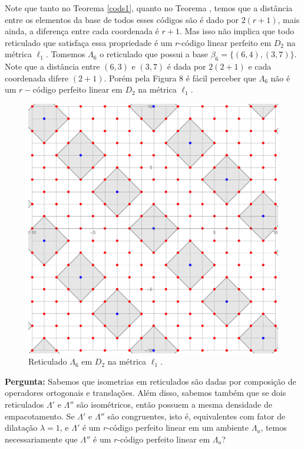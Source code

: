 \documentclass{article}
\theoremstyle{plain}
\theoremstyle{definition}
\theoremstyle{remark}
\begin{document}
  Note que tanto no Teorema \ref{cods1}, quanto no Teorema , temos que a distância entre os elementos da base de todos esses códigos são é dado por $2(r+1)$, mais ainda, a diferença entre cada coordenada é $r+1$. Mas isso não implica que todo reticulado que satisfaça essa propriedade é um $r$-código linear perfeito em $D_2$ na métrica $\ell_1$. Tomemos $\Lambda_6$ o reticulado que possui a base $\beta_6 = \{(6,4),(3,7)\}$. Note que a distância entre $(6,3)$ e $(3,7)$ é dada por $2(2+1)$ e cada coordenada difere $(2+1)$. Porém pela Figura 8 é fácil perceber que $\Lambda_6$ não é um $r-$código perfeito linear em $D_2$ na métrica $\ell_1$. 

  \begin{figure}[ht]
    \centering
        \includegraphics[scale=0.23]{notperfect.pdf}
        \caption{Reticulado $\Lambda_6$ em $D_2$ na métrica $\ell_1$.}
  \end{figure}

  \hspace{-0.5cm}\textbf{Pergunta:} Sabemos que isometrias em reticulados são dadas por composição de operadores ortogonais e translações. Além disso, sabemos também que se dois reticulados $\Lambda'$ e $\Lambda''$ são isométricos, então possuem a mesma densidade de empacotamento. Se $\Lambda'$ e $\Lambda''$ são congruentes, isto é, equivalentes com fator de dilatação $\lambda=1$, e $\Lambda'$ é um $r$-código perfeito linear em um ambiente $\Lambda_a$, temos necessariamente que $\Lambda''$ é um $r$-código perfeito linear em $\Lambda_a$?

  
\end{document}
